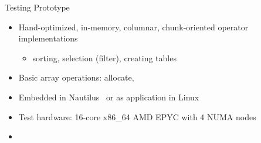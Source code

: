 \begin{block}{Testing Prototype}
  \begin{itemize}
  \item Hand-optimized, in-memory, columnar, chunk-oriented operator implementations
    \begin{itemize}
    \item sorting, selection (filter), creating tables
    \end{itemize}
  \item Basic array operations: allocate, 
  \item Embedded in Nautilus~\cite{HALE:2015:NAUTILUS} or as application in Linux
  \item Test hardware: 16-core x86\_64 AMD EPYC with 4 NUMA nodes
 \item {}
  \end{itemize}
\end{block}
